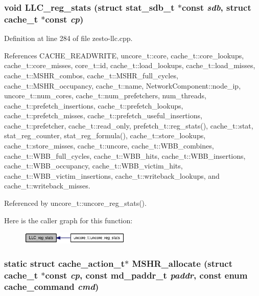 \subsubsection[{LLC\_\-reg\_\-stats}]{\setlength{\rightskip}{0pt plus 5cm}void LLC\_\-reg\_\-stats (struct {\bf stat\_\-sdb\_\-t} $\ast$const  {\em sdb}, \/  struct {\bf cache\_\-t} $\ast$const  {\em cp})}\label{zesto-llc_8cpp_0a1aa47236ccba0a1d5e5818052a830d}




Definition at line 284 of file zesto-llc.cpp.

References CACHE\_\-READWRITE, uncore\_\-t::core, cache\_\-t::core\_\-lookups, cache\_\-t::core\_\-misses, core\_\-t::id, cache\_\-t::load\_\-lookups, cache\_\-t::load\_\-misses, cache\_\-t::MSHR\_\-combos, cache\_\-t::MSHR\_\-full\_\-cycles, cache\_\-t::MSHR\_\-occupancy, cache\_\-t::name, NetworkComponent::node\_\-ip, uncore\_\-t::num\_\-cores, cache\_\-t::num\_\-prefetchers, num\_\-threads, cache\_\-t::prefetch\_\-insertions, cache\_\-t::prefetch\_\-lookups, cache\_\-t::prefetch\_\-misses, cache\_\-t::prefetch\_\-useful\_\-insertions, cache\_\-t::prefetcher, cache\_\-t::read\_\-only, prefetch\_\-t::reg\_\-stats(), cache\_\-t::stat, stat\_\-reg\_\-counter, stat\_\-reg\_\-formula(), cache\_\-t::store\_\-lookups, cache\_\-t::store\_\-misses, cache\_\-t::uncore, cache\_\-t::WBB\_\-combines, cache\_\-t::WBB\_\-full\_\-cycles, cache\_\-t::WBB\_\-hits, cache\_\-t::WBB\_\-insertions, cache\_\-t::WBB\_\-occupancy, cache\_\-t::WBB\_\-victim\_\-hits, cache\_\-t::WBB\_\-victim\_\-insertions, cache\_\-t::writeback\_\-lookups, and cache\_\-t::writeback\_\-misses.

Referenced by uncore\_\-t::uncore\_\-reg\_\-stats().

Here is the caller graph for this function:\nopagebreak
\begin{figure}[H]
\begin{center}
\leavevmode
\includegraphics[width=147pt]{zesto-llc_8cpp_0a1aa47236ccba0a1d5e5818052a830d_icgraph}
\end{center}
\end{figure}
\subsubsection[{MSHR\_\-allocate}]{\setlength{\rightskip}{0pt plus 5cm}static struct {\bf cache\_\-action\_\-t}$\ast$ MSHR\_\-allocate (struct {\bf cache\_\-t} $\ast$const  {\em cp}, \/  const {\bf md\_\-paddr\_\-t} {\em paddr}, \/  const enum {\bf cache\_\-command} {\em cmd})\hspace{0.3cm}{\tt  [static, read]}}\label{zesto-llc_8cpp_b9e90f1afc77db8eb4dad712b12304ac}




